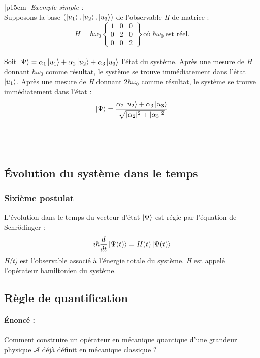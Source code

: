 \documentclass[12pt,a4paper,titlepage]{book}
\begin{document}
\begin{tabular}{|p{15cm}|}
\hline
\textit{Exemple simple :}\\
Supposons la base $(\ket{u_1}, \ket{u_2}, \ket{u_3})$ de l'observable \textit{H} de matrice :\\
\[
H = \hbar \omega_0
\left\lbrace
\begin{matrix}
1 & 0 & 0\\
0 & 2 & 0\\
0 & 0 & 2
\end{matrix}
\right\rbrace
~\text{où}~ \hbar \omega_0 ~\text{est réel.}
\]\\
Soit $\ket\Psi = \alpha_1 \ket{u_1} + \alpha_2 \ket{u_2} + \alpha_3 \ket{u_3}$ l'état du système. Après une mesure de \textit{H} donnant $\hbar \omega_0$ comme résultat, le système se trouve immédiatement dans l'état $\ket{u_1}$. Après une mesure de \textit{H} donnant $2 \hbar \omega_0$ comme résultat, le système se trouve immédiatement dans l'état :\\
\begin{equation*}
\ket\Psi = \frac{\alpha_2 \ket{u_2} + \alpha_3 \ket{u_3}}{\sqrt{\vert \alpha_2 \vert^2 + \vert \alpha_3 \vert^2}}
\end{equation*}\\

\hline
\end{tabular}\\

\subsection{Évolution du système dans le temps}
\subsubsection{Sixième postulat}
L'évolution dans le temps du vecteur d'état $\ket\Psi$ est régie par l'équation de Schrödinger :\\
\begin{equation*}
i \hbar \frac{d}{dt} \ket{\Psi(t)} = H(t) \ket{\Psi(t)}
\end{equation*}
\textit{H(t)} est l'observable associé à l'énergie totale du système. \textit{H} est appelé l'opérateur hamiltonien du système.
\subsection{Règle de quantification}
\paragraph*{Énoncé :}
Comment construire un opérateur en mécanique quantique d'une grandeur physique $\mathcal{A}$ déjà définit en mécanique classique ?\\
\end{document}
